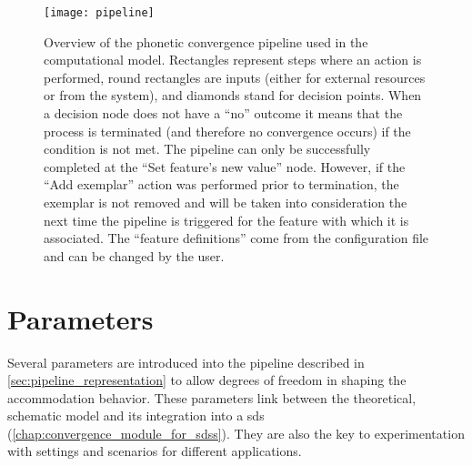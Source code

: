 \begin{figure}[h!]
	\centering
	\texttt{[image: pipeline]}
	\caption[Phonetic convergence algorithm pipeline]{Overview of the phonetic convergence pipeline used in the computational model.
		Rectangles represent steps where an action is performed, round rectangles are inputs (either for external resources or from the system), and diamonds stand for decision points.
		When a decision node does not have a \enquote{no} outcome it means that the process is terminated (and therefore no convergence occurs) if the condition is not met.
		The pipeline can only be successfully completed at the \enquote{Set feature's new value} node.
		However, if the \enquote{Add exemplar} action was performed prior to termination, the exemplar is not removed and will be taken into consideration the next time the pipeline is triggered for the feature with which it is associated.
		The \enquote{feature definitions} come from the configuration file and can be changed by the user.}
	\label{fig:adaptation_module_pipeline}
\end{figure}

\section{Parameters}
\label{sec:parameters}

Several parameters are introduced into the pipeline described in \cref{sec:pipeline_representation} to allow degrees of freedom in shaping the accommodation behavior.
These parameters link between the theoretical, schematic model and its integration into a \ac{sds} (\cref{chap:convergence_module_for_sdss}).
They are also the key to experimentation with settings and scenarios for different applications.

